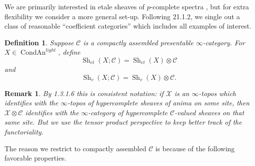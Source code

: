 \documentclass[12pt]{article}
\newtheorem{definition}[theorem]{Definition}
\newtheorem{remark}[theorem]{Remark}
\newcommand{\on}{\operatorname}
\begin{document}
We are primarily interested in etale sheaves of $p$-complete spectra , but for extra flexibility we consider a more general set-up.  Following \cite{LurieSAG} 21.1.2, we single out a class of reasonable ``coefficient categories'' which includes all examples of interest.

\begin{definition}
Suppose $\mathcal{C}$ is a compactly assembled presentable $\infty$-category.  For $X\in\on{CondAn}^{light}$, define
$$\on{Sh}_{et}(X;\mathcal{C}) = \on{Sh}_{et}(X)\otimes\mathcal{C}$$
and
$$\on{Sh}_v(X;\mathcal{C}) = \on{Sh}_v(X)\otimes \mathcal{C}.$$
\end{definition}

\begin{remark}
By \cite{LurieSAG} 1.3.1.6 this is consistent notation: if $\mathcal{X}$ is an $\infty$-topos which identifies with the $\infty$-topos of hypercomplete sheaves of anima on some site, then $\mathcal{X}\otimes \mathcal{C}$ identifies with the $\infty$-category of hypercomplete $\mathcal{C}$-valued sheaves on that same site.  But we use the tensor product perspective to keep better track of the functoriality.
\end{remark}

The reason we restrict to compactly assembled $\mathcal{C}$ is because of the following favorable properties.
\end{document}
